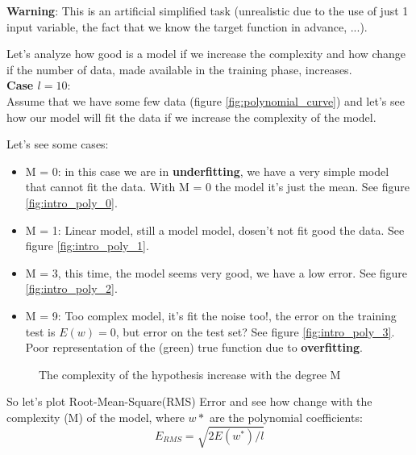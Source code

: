 \documentclass[../main.tex]{subfiles}
\begin{document}
\textbf{Warning}: This is an artificial simplified task (unrealistic due to the use of just 1 input variable, the fact that we know the target function in advance, ...).

Let's analyze how good is a model if we increase the complexity and how change if the number of data, made available in the training phase, increases.\\
\noindent \textbf{Case $l = 10$}:\\
Assume that we have some few data  (figure \ref{fig:polynomial_curve}) and let's see how our model will fit the data if we increase the complexity of the model.

Let's see some cases:
\begin{itemize}
    \item M = 0: in this case we are in \textbf{underfitting}, we have a very simple model that cannot fit the data. With M = 0 the model it's just the mean. See figure \ref{fig:intro_poly_0}.
    \item M = 1: Linear model,  still a model model, dosen't not fit good the data. See figure \ref{fig:intro_poly_1}.
    \item M = 3, this time, the model seems very good, we have a low error. See figure \ref{fig:intro_poly_2}.
    \item M = 9: Too complex model, it's fit the noise too!, the error on the training test is $E(w) = 0$, but error on the test set?  See figure \ref{fig:intro_poly_3}. Poor representation of the (green) true function due to \textbf{overfitting}.
\end{itemize}

\begin{figure}[ht]
  \centering
  \caption{The complexity of the hypothesis increase with the degree M}
\end{figure}

So let's plot Root-Mean-Square(RMS) Error and see how change with the complexity (M) of the model, where $w*$ are the polynomial coefficients:
$$ E_{RMS} = \sqrt{2E(w^*)/l}$$
\end{document}
